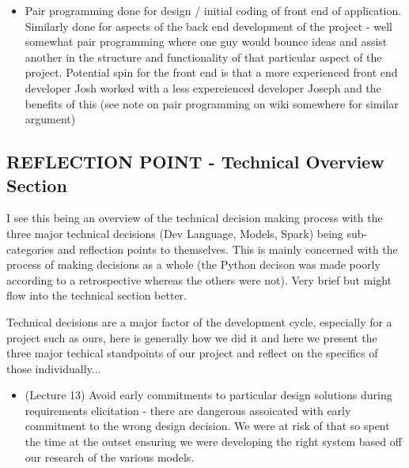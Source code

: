 \documentclass{l3proj}
\begin{document}
\begin{itemize}
\item Pair programming done for design / initial coding of front end of application. Similarly done for aspects of the back end development of the project - well somewhat pair programming where one guy would bounce ideas and assist another in the structure and functionality of that particular aspect of the project. Potential spin for the front end is that a more experienced front end developer Josh worked with a less expereienced developer Joseph and the benefits of this (see note on pair programming on wiki somewhere for similar argument)
\end{itemize}



\subsection{REFLECTION POINT - Technical Overview Section}
\label{sec:techoverviewreflection}
I see this being an overview of the technical decision making process with the three major technical decisions (Dev Language, Models, Spark) being sub-categories and reflection points to themselves. This is mainly concerned with the process of making decisions as a whole (the Python decison was made poorly according to a retrospective whereas the others were not). Very brief but might flow into the technical section better.

Technical decisions are a major factor of the development cycle, especially for a project such as ours, here is generally how we did it and here we present the three major techical standpoints of our project and reflect on the specifics of those individually...

\begin{itemize}
\item (Lecture 13) Avoid early commitments to particular design solutions during requirements elicitation - there are dangerous assoicated with early commitment to the wrong design decision. We were at risk of that so spent the time at the outset ensuring we were developing the right system based off our research of the various models.
\end{itemize}

\end{document}

